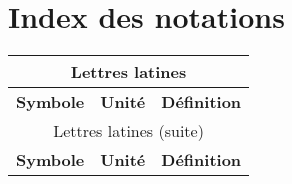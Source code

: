 \chapter{Index des notations}\label{chap:IndexNotations}%

\begin{center}
    \begin{longtable}{p{} p{} p{}}
        \multicolumn{3}{c}{Lettres latines}  \\\hline
        \textbf{Symbole} & \textbf{Unité} & \textbf{Définition} \\\hline\hline \endfirsthead
        \multicolumn{3}{c}{Lettres latines (suite)}  \\\hline
        \textbf{Symbole} & \textbf{Unité} & \textbf{Définition} \\\hline\hline \endhead
		

\end{longtable}
\end{center}

